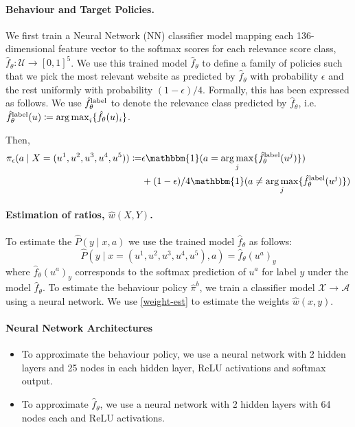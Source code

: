 \paragraph{Behaviour and Target Policies.}
We first train a Neural Network (NN) classifier model mapping each 136-dimensional feature vector to the
softmax scores for each relevance score class, $\hat{f}_\theta:\mathcal{U} \rightarrow [0,1]^5$. We use this trained model $\hat{f}_\theta$ to define a family of policies such that we pick the most relevant website as predicted by $\hat{f}_\theta$ with probability $\epsilon$ and the rest uniformly with probability $(1-\epsilon)/4$. Formally, this has been expressed as follows. We use $\hat{f}^{\textup{label}}_\theta$ to denote the relevance class predicted by $\hat{f}_\theta$, i.e. $\hat{f}^{\textup{label}}_\theta(u) \coloneqq \operatorname*{arg\,max}_i\{\hat{f}_\theta(u)_i\}$. 

Then,
\begin{align}
    \pi_\epsilon (a\mid X=(u^1, u^2,u^3,u^4,u^5)) \coloneqq& \epsilon \mathbbm{1}(a = \argmax_j\{ \hat{f}^{\textup{label}}_\theta(u^j) \}) \nonumber \\
    &+ (1-\epsilon)/4 \mathbbm{1}(a \neq \argmax_j\{ \hat{f}^{\textup{label}}_\theta(u^j) \}) \nonumber
\end{align}

\paragraph{Estimation of ratios, $\hat{w}(X, Y)$.}
To estimate the $\hat{P}(y \mid x, a)$ we use the trained model $\hat{f}_\theta$ as follows:
\[
\hat{P}(y \mid x = (u^1, u^2,u^3,u^4,u^5), a) = \hat{f}_\theta(u^a)_y
\]
where $\hat{f}_\theta(u^a)_y$ corresponds to the softmax prediction of $u^a$ for label $y$ under the model $\hat{f}_\theta$. To estimate the behaviour policy $\hat{\pi}^b$, we train a classifier model $\mathcal{X} \rightarrow \mathcal{A}$ using a neural network. We use \eqref{weight-est} to estimate the weights $\hat{w}(x, y)$.


\paragraph{Neural Network Architectures}
\begin{itemize}
    \item To approximate the behaviour policy, we use a neural network with 2 hidden layers and 25 nodes in each hidden layer, ReLU activations and softmax output.
    \item To approximate $\hat{f}_{\theta}$, we use a neural network with 2 hidden layers with 64 nodes each and ReLU activations.
\end{itemize}

